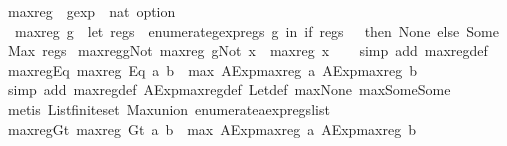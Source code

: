 \begin{isabellebody}
%
\endisatagproof
{\isafoldproof}%
%
\isadelimproof
\isanewline
%
\endisadelimproof
\isanewline
{}\isamarkupfalse%
\ max{\isacharunderscore}reg\ {\isacharcolon}{\isacharcolon}\ {\isachardoublequoteopen}gexp\ {\isasymRightarrow}\ nat\ option{\isachardoublequoteclose}\ \isanewline
\ \ {\isachardoublequoteopen}max{\isacharunderscore}reg\ g\ {\isacharequal}\ {\isacharparenleft}let\ regs\ {\isacharequal}\ {\isacharparenleft}enumerate{\isacharunderscore}gexp{\isacharunderscore}regs\ g{\isacharparenright}\ in\ if\ regs\ {\isacharequal}\ {\isacharbraceleft}{\isacharbraceright}\ then\ None\ else\ Some\ {\isacharparenleft}Max\ regs{\isacharparenright}{\isacharparenright}{\isachardoublequoteclose}\isanewline
\isanewline
{}\isamarkupfalse%
\ max{\isacharunderscore}reg{\isacharunderscore}gNot{\isacharcolon}\ {\isachardoublequoteopen}max{\isacharunderscore}reg\ {\isacharparenleft}gNot\ x{\isacharparenright}\ {\isacharequal}\ max{\isacharunderscore}reg\ x{\isachardoublequoteclose}\isanewline
%
\isadelimproof
\ \ %
\endisadelimproof
%
\isatagproof
{}\isamarkupfalse%
\ {\isacharparenleft}simp\ add{\isacharcolon}\ max{\isacharunderscore}reg{\isacharunderscore}def{\isacharparenright}%
\endisatagproof
{\isafoldproof}%
%
\isadelimproof
\isanewline
%
\endisadelimproof
\isanewline
{}\isamarkupfalse%
\ max{\isacharunderscore}reg{\isacharunderscore}Eq{\isacharcolon}\ {\isachardoublequoteopen}max{\isacharunderscore}reg\ {\isacharparenleft}Eq\ a\ b{\isacharparenright}\ {\isacharequal}\ max\ {\isacharparenleft}AExp{\isachardot}max{\isacharunderscore}reg\ a{\isacharparenright}\ {\isacharparenleft}AExp{\isachardot}max{\isacharunderscore}reg\ b{\isacharparenright}{\isachardoublequoteclose}\isanewline
%
\isadelimproof
\ \ %
\endisadelimproof
%
\isatagproof
{}\isamarkupfalse%
\ {\isacharparenleft}simp\ add{\isacharcolon}\ max{\isacharunderscore}reg{\isacharunderscore}def\ AExp{\isachardot}max{\isacharunderscore}reg{\isacharunderscore}def\ Let{\isacharunderscore}def\ max{\isacharunderscore}None\ max{\isacharunderscore}Some{\isacharunderscore}Some{\isacharparenright}\isanewline
\ \ \isamarkupfalse%
\ {\isacharparenleft}metis\ List{\isachardot}finite{\isacharunderscore}set\ Max{\isachardot}union\ enumerate{\isacharunderscore}aexp{\isacharunderscore}regs{\isacharunderscore}list{\isacharparenright}%
\endisatagproof
{\isafoldproof}%
%
\isadelimproof
\isanewline
%
\endisadelimproof
\isanewline
{}\isamarkupfalse%
\ max{\isacharunderscore}reg{\isacharunderscore}Gt{\isacharcolon}\ {\isachardoublequoteopen}max{\isacharunderscore}reg\ {\isacharparenleft}Gt\ a\ b{\isacharparenright}\ {\isacharequal}\ max\ {\isacharparenleft}AExp{\isachardot}max{\isacharunderscore}reg\ a{\isacharparenright}\ {\isacharparenleft}AExp{\isachardot}max{\isacharunderscore}reg\ b{\isacharparenright}{\isachardoublequoteclose}\isanewline

\end{isabellebody}
